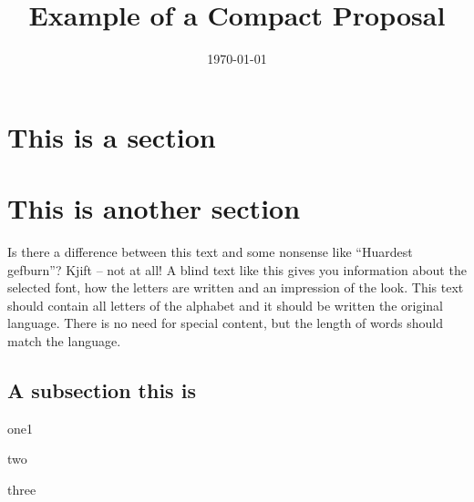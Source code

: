 \documentclass[final]{compact_proposal}
\title{Example of a Compact Proposal}
\date{\today}
\begin{document}
 
\maketitle


\section{This is a section}
\blindtext[4]


\section{This is another section}
Is there a difference between this text and some nonsense like ``Huardest gefburn''? Kjift – not at all!  
A blind text like this gives you information about the selected font, how the letters are written and  an impression of the look.
This text should contain all letters of the alphabet and it should be written  the original language. 
There is no need for special content, but the length of words should match the language. 

\subsection{A subsection this is}
\blindtext[1]
\begin{tightitemize}
    \item one1
    \item two
    \item three
\end{tightitemize}
\blindtext[4]
\end{document}
